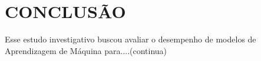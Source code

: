 \chapter{CONCLUSÃO}

Esse estudo investigativo buscou avaliar o desempenho de modelos de Aprendizagem de Máquina para....(continua)